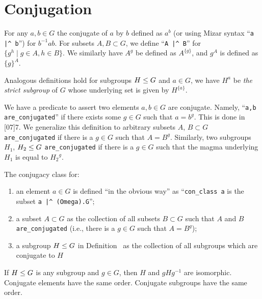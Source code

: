 \section{Conjugation}
For any $a,b\in G$ the conjugate of $a$ by $b$ defined as $a^{b}$ (or
using Mizar syntax ``\lstinline{a |^ b}'')
for $b^{-1}ab$. For subsets $A,B\subset G$, we define
``\lstinline{A |^ B}'' for $\{g^{h}\mid g\in A,h\in B\}$. We similarly have
$A^{g}$ be defined as $A^{\{g\}}$, and $g^{A}$ is defined as $\{g\}^{A}$.

Analogous definitions hold for subgroups $H\leq G$ and $a\in G$, we
have $H^{a}$ be \emph{the strict subgroup} of $G$ whose underlying set
is given by $H^{\{a\}}$.

We have a predicate to assert two elements $a,b\in G$ are
conjugate. Namely, ``\lstinline{a,b are_conjugated}'' if there exists some
$g\in G$ such that $a = b^{g}$. This is done in
[07]{7}. We generalize this
definition to arbitrary subsets $A$, $B\subset G$ \lstinline{are_conjugated} if
there is a $g\in G$ such that $A = B^{g}$. Similarly, two subgroups
$H_{1}$, $H_{2}\leq G$ \lstinline{are_conjugated} if there is a $g\in G$
such that the magma underlying $H_{1}$ is equal to ${H_{2}}^{g}$.

The conjugacy class for:
\begin{enumerate}
\item an element $a\in G$ is defined ``in the obvious way''
as ``\lstinline{con_class a}
is the subset \lstinline{a |^ (Omega).G}'';
\item a subset $A\subset G$ as the collection of all subsets $B\subset G$
such that $A$ and $B$ \lstinline{are_conjugated} (i.e., there is a $g\in G$
such that $A = B^{g}$);
\item a subgroup $H\leq G$ in Definition~ as the
  collection of all subgroups which are conjugate to $H$
\end{enumerate}

\begin{theorem}
  If $H\leq G$ is any subgroup and $g\in G$, then
  $H$ and $gHg^{-1}$ are isomorphic. Conjugate elements have the same
  order. Conjugate subgroups have the same order.
\end{theorem}

